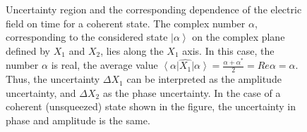 \begin{figure}
\centering



\caption{Uncertainty region and the corresponding dependence
  of the electric field on time for a coherent
  state.
  The complex number $\alpha$,
  corresponding to the considered state $\left|\alpha\right>$ on the
  complex plane defined by $X_1$ and $X_2$, lies along the
  $X_1$ axis.
  In this case, the number $\alpha$ is real, the average value
  $\left<\alpha\right|\hat{X_1}\left|\alpha\right> =
  \frac{\alpha + \alpha^\ast}{2} = 
  Re \alpha = \alpha$.
  Thus, the uncertainty $\Delta X_1$ can
  be interpreted as the amplitude uncertainty, and $\Delta X_2$ as
  the phase uncertainty. In the case of a coherent
  (unsqueezed) state shown in the figure, the uncertainty in phase and amplitude is the same.}
\label{figPart3Squeezed_1}
\end{figure}